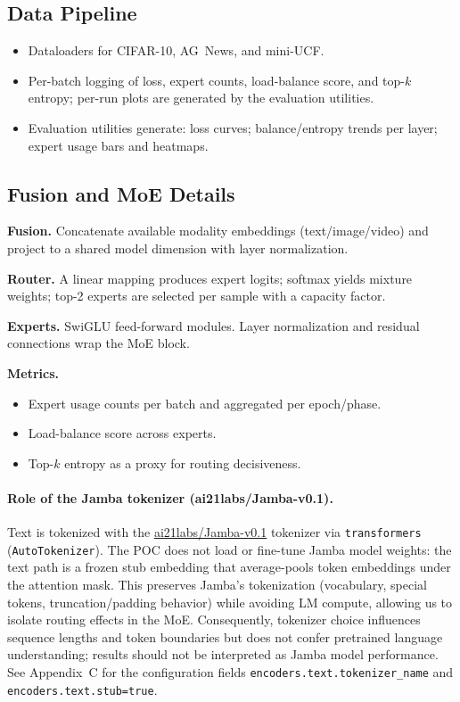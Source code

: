 \documentclass[11pt,a4paper]{article}
\newcommand{\CIFAR}{CIFAR-10}
\newcommand{\AGNEWS}{AG~News}
\newcommand{\MINIUCF}{mini-UCF}
\begin{document}
\subsection{Data Pipeline}
\begin{itemize}[leftmargin=*]
  \item Dataloaders for \CIFAR{}, \AGNEWS{}, and \MINIUCF{}.
  \item Per-batch logging of loss, expert counts, load-balance score, and top-$k$ entropy; per-run plots are generated by the evaluation utilities.
  \item Evaluation utilities generate: loss curves; balance/entropy trends per layer; expert usage bars and heatmaps.
\end{itemize}

\subsection{Fusion and MoE Details}
\textbf{Fusion.} Concatenate available modality embeddings (text/image/video) and project to a shared model dimension with layer normalization.

\textbf{Router.} A linear mapping produces expert logits; softmax yields mixture weights; top-2 experts are selected per sample with a capacity factor.

\textbf{Experts.} SwiGLU feed-forward modules. Layer normalization and residual connections wrap the MoE block.

\textbf{Metrics.}
\begin{itemize}[leftmargin=*]
\item Expert usage counts per batch and aggregated per epoch/phase.
\item Load-balance score across experts.
\item Top-$k$ entropy as a proxy for routing decisiveness.
\end{itemize}

\paragraph{Role of the Jamba tokenizer (ai21labs/Jamba-v0.1).}
Text is tokenized with the \href{https://huggingface.co/ai21labs/Jamba-v0.1}{ai21labs/Jamba-v0.1} tokenizer via \texttt{transformers} (\texttt{AutoTokenizer})\cite{jamba2024}. The POC does not load or fine-tune Jamba model weights: the text path is a frozen stub embedding that average-pools token embeddings under the attention mask. This preserves Jamba’s tokenization (vocabulary, special tokens, truncation/padding behavior) while avoiding LM compute, allowing us to isolate routing effects in the MoE. Consequently, tokenizer choice influences sequence lengths and token boundaries but does not confer pretrained language understanding; results should not be interpreted as Jamba model performance. See Appendix~C for the configuration fields \texttt{encoders.text.tokenizer\_name} and \texttt{encoders.text.stub=true}.
\end{document}
